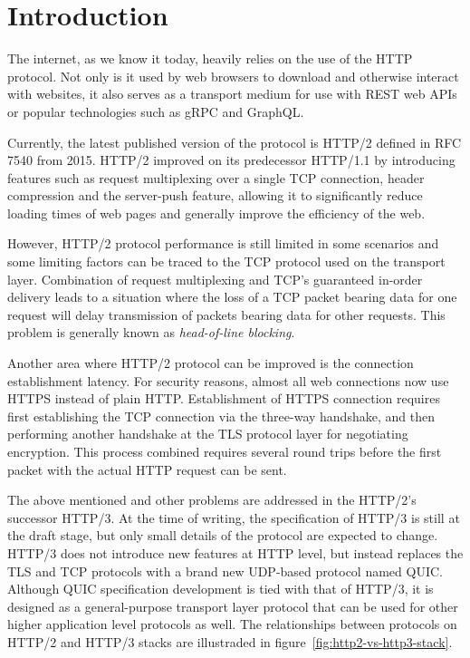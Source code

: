 \chapter{Introduction}

The internet, as we know it today, heavily relies on the use of the HTTP protocol. Not only is it
used by web browsers to download and otherwise interact with websites, it also serves as a transport
medium for use with REST web APIs or popular technologies such as gRPC and GraphQL\@.

Currently, the latest published version of the protocol is HTTP/2 defined in RFC 7540 from 2015.
HTTP/2 improved on its predecessor HTTP/1.1 by introducing features such as request multiplexing
over a single TCP connection, header compression and the server-push feature, allowing it to
significantly reduce loading times of web pages and generally improve the efficiency of the web.

However, HTTP/2 protocol performance is still limited in some scenarios and some limiting
factors can be traced to the TCP protocol used on the transport layer. Combination of request
multiplexing and TCP's guaranteed in-order delivery leads to a situation where the loss of a TCP
packet bearing data for one request will delay transmission of packets bearing data for other
requests. This problem is generally known as \textit{head-of-line blocking}.

Another area where HTTP/2 protocol can be improved is the connection establishment latency. For
security reasons, almost all web connections now use HTTPS instead of plain HTTP\@.
Establishment of HTTPS connection requires first establishing the TCP connection via the three-way
handshake, and then performing another handshake at the TLS protocol layer for negotiating
encryption. This process combined requires several round trips before the first packet with the
actual HTTP request can be sent.

The above mentioned and other problems are addressed in the HTTP/2's successor HTTP/3. At the time
of writing, the specification of HTTP/3 is still at the draft stage, but only small details of the
protocol are expected to change. HTTP/3 does not introduce new features at HTTP level, but instead
replaces the TLS and TCP protocols with a brand new UDP-based protocol named QUIC\@. Although QUIC
specification development is tied with that of HTTP/3, it is designed as a general-purpose transport
layer protocol that can be used for other higher application level protocols as well. The
relationships between protocols on HTTP/2 and HTTP/3 stacks are illustraded in
figure~\ref{fig:http2-vs-http3-stack}.

